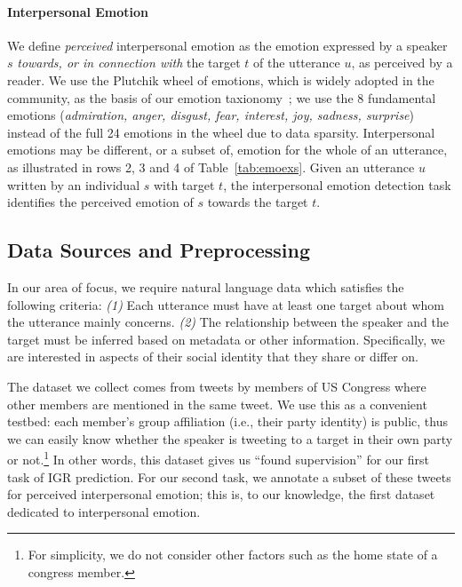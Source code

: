 \paragraph{Interpersonal Emotion} We define \emph{perceived} interpersonal emotion as the emotion expressed by a speaker $s$ \emph{towards, or in connection with} the target $t$ of the utterance $u$, as perceived by a reader.  We use the Plutchik wheel of emotions, which is widely adopted in the community, as the basis of our emotion taxionomy~\cite{plutchik2001nature}; we use the 8 fundamental  emotions (\emph{admiration, anger, disgust, fear, interest, joy, sadness, surprise}) instead of the full 24 emotions in the wheel due to data sparsity. Interpersonal emotions may be different, or a subset of, emotion for the whole of an utterance, as illustrated in rows 2, 3 and 4 of Table~\ref{tab:emoexs}. Given an utterance $u$ written by an individual $s$ with target $t$, the interpersonal emotion detection task identifies the perceived emotion of $s$ towards the target $t$.

\subsection{Data Sources and Preprocessing}
\label{subsec:twitter-datasources}

In our area of focus, we require natural language data which satisfies the following criteria: \emph{(1)} Each utterance must have at least one target about whom the utterance mainly concerns. \emph{(2)} The relationship between the speaker and the target must be inferred based on metadata or other information. Specifically, we are interested in aspects of their social identity that they share or differ on.

The dataset we collect comes from tweets by members of US Congress where other members are mentioned in the same tweet. We use this as a convenient testbed: each member's group affiliation (i.e., their party identity) is public, thus we can easily know whether the speaker is tweeting to a target in their own party or not.\footnote{For simplicity, we do not consider other factors such as the home state of a congress member.} In other words, this dataset gives us ``found supervision'' for our first task of IGR prediction. For our second task, we annotate a subset of these tweets for perceived interpersonal emotion; this is, to our knowledge, the first dataset dedicated to interpersonal emotion.

